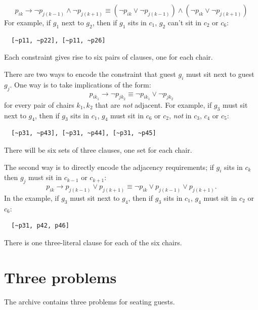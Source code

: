\documentclass[11pt]{report}
\newcommand*{\ngg}{\mathop{\neg}}
\begin{document}
\begin{displaymath}
p_{ik} \rightarrow \ngg p_{j(k-1)} \wedge \ngg p_{j(k+1)} \equiv
(\ngg p_{ik} \vee \ngg p_{j(k-1)} ) \wedge
(\ngg p_{ik} \vee \ngg p_{j(k+1)} ) 
\end{displaymath}
For example, if $g_1$  next to $g_2$, then if $g_1$ sits
in $c_1$, $g_2$ can't sit in $c_2$ or $c_6$:

\begin{verbatim}
  [~p11, ~p22], [~p11, ~p26]
\end{verbatim}
Each constraint gives rise to six pairs of clauses, one for each chair.

There are two ways to encode the constraint that guest $g_i$ must sit
next to guest $g_j$. One way is to take implications of the form:
\begin{displaymath}
p_{ik_{1}} \rightarrow \ngg p_{jk_{2}} \equiv
\ngg p_{ik_{1}} \vee \ngg p_{jk_{2}}
\end{displaymath}
for every pair of chairs $k_1, k_2$ that are \emph{not} adjacent. For
example, if $g_3$ must sit next to $g_4$, then if $g_3$ sits in $c_1$,
$g_4$ must sit in $c_6$ or $c_2$, \emph{not} in $c_3$, $c_4$ or $c_5$:

\begin{verbatim}
  [~p31, ~p43], [~p31, ~p44], [~p31, ~p45] 
\end{verbatim}
There will be six sets of three clauses, one set for each chair.

The second way is to directly encode the adjacency requirements; if
$g_i$ sits in $c_{k}$ then $g_j$ must sit in $c_{k-1}$ or $c_{k+1}$:
\begin{displaymath}
p_{ik} \rightarrow p_{j(k-1)} \vee p_{j(k+1)} \equiv
\ngg p_{ik} \vee p_{j(k-1)} \vee p_{j(k+1)}.
\end{displaymath}
In the example, if $g_3$ must sit next to $g_4$, then if $g_3$ sits in
$c_1$, $g_4$ must sit in $c_2$ or $c_6$:
\begin{verbatim}
  [~p31, p42, p46]
\end{verbatim}
There is one three-literal clause for each of the six chairs.


\section{Three problems}

The archive contains three problems for seating guests.
\end{document}
